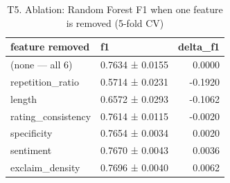 \begin{table}
\caption{T5. Ablation: Random Forest F1 when one feature is removed (5-fold CV)}
\begin{tabular}{llr}
\toprule
feature removed & f1 & delta_f1 \\
\midrule
(none — all 6) & 0.7634 ± 0.0155 & 0.0000 \\
repetition_ratio & 0.5714 ± 0.0231 & -0.1920 \\
length & 0.6572 ± 0.0293 & -0.1062 \\
rating_consistency & 0.7614 ± 0.0115 & -0.0020 \\
specificity & 0.7654 ± 0.0034 & 0.0020 \\
sentiment & 0.7670 ± 0.0043 & 0.0036 \\
exclaim_density & 0.7696 ± 0.0040 & 0.0062 \\
\bottomrule
\end{tabular}
\end{table}
